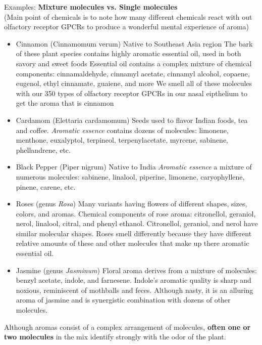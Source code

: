 \documentclass{article}
\begin{document}
\noindent Examples: \textbf{Mixture molecules vs. Single molecules} \\
(Main point of chemicals is to note how many different chemicals react with out olfactory receptor GPCRs to produce a wonderful mental experience of aroma)\\
\begin{itemize}
    \item Cinnamon (Cinnamomum verum)
        \subitem Native to Southeast Asia region
        \subitem The bark of these plant species contains highly aromatic essential oil, used in both savory and sweet foods
        \subitem Essential oil contains a complex mixture of chemical components: cinnamaldehyde, cinnamyl acetate, cinnamyl alcohol, copaene, eugenol, ethyl cinnamate, guaiene, and more
        \subitem We smell all of these molecules with our 350 types of olfactory receptor GPCRs in our nasal eipthelium to get the aroma that is cinnamon
    \item Cardamom (Elettaria cardamomum)
        \subitem Seeds used to flavor Indian foods, tea and coffee. 
        \subitem \textit{Aromatic essence} contains dozens of molecules: limonene, menthone, euxalyptol, terpineol, terpenylacetate, myrcene, sabinene, phellandrene, etc. 
    \item Black Pepper (Piper nigrum)
        \subitem Native to India
        \subitem \textit{Aromatic essence} a mixture of numerous molecules: sabinene, linalool, piperine, limonene, caryophyllene, pinene, carene, etc.
    \item Roses (genus \textit{Rosa})
        \subitem Many variants having flowers of different shapes, sizes, colors, and aromas. 
        \subitem Chemical components of rose aroma: citronellol, geraniol, nerol, linalool, citral, and phenyl ethanol. 
        \subitem Citronellol, geraniol, and nerol have similar molecular shapes. Roses smell differently because they have different relative amounts of these and other molecules that make up there aromatic essential oil. 
    \item Jasmine (genus \textit{Jasminum})
        \subitem Floral aroma derives from a mixture of molecules: benzyl acetate, indole, and farnesene. 
        \subitem Indole's aromatic quality is sharp and noxious, reminiscent of mothballs and feces. Although nasty, it is an alluring aroma of jasmine and is synergistic combination with dozens of other molecules. 
\end{itemize}

Although aromas consist of a complex arrangement of molecules, \textbf{often one or two molecules} in the mix identify strongly with the odor of the plant. \\
\end{document}
